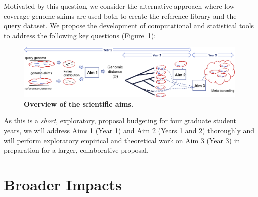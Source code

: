 Motivated by this question, we consider the alternative approach where
low coverage genome-skims are used both to create the reference
library and the query dataset. We propose the development of
computational and statistical tools to address the following key
questions (Figure~\ref{fig:overview}):
\begin{packed_desc}
\item [Aim 1:] 
\item [Aim 2:] 
\item [Aim 3:] 
\end{packed_desc}
\begin{figure}
\centering
  \includegraphics[width=1\textwidth]{fig/Overview.png}
\vspace{-20pt}\caption{{\bf Overview of the scientific aims.}}
  \label{fig:overview}
\end{figure}
As this is a \emph{short}, exploratory, proposal budgeting for four graduate student years, we will address Aims 1 (Year 1) and Aim 2 (Years 1 and 2) thoroughly and will perform exploratory empirical and theoretical work on Aim 3 (Year 3) in preparation for a larger, collaborative proposal.

\section{Broader Impacts}

